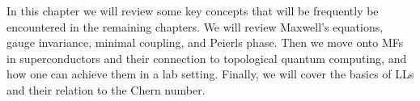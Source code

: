 In this chapter we will review some key concepts that will be frequently be encountered in the remaining chapters.
We will review Maxwell's equations, gauge invariance, minimal coupling, and Peierls phase.
Then we move onto MFs in superconductors and their connection to topological quantum computing, and how one can achieve them in a lab setting.
Finally, we will cover the basics of LLs and their relation to the Chern number.
